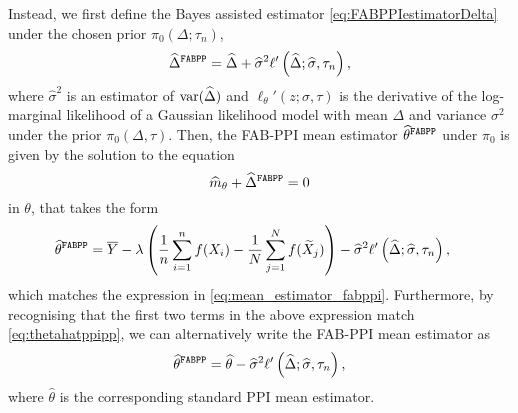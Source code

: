 Instead, we first define the Bayes assisted estimator \eqref{eq:FABPPIestimatorDelta} under the chosen prior $\pi_0(\Delta; \tau_n)$,
\begin{equation*}
    \widehat\Delta^{\mathrm{\texttt{FABPP}}} = \widehat\Delta + \widehat\sigma^2 \ell'\left(\widehat\Delta; \widehat\sigma, \tau_n\right),
\end{equation*}
where $\widehat\sigma^2$ is an estimator of $\mathrm{var}(\widehat\Delta)$ and $\ell_\theta'(z; \sigma, \tau)$ is the derivative of the log-marginal likelihood of a Gaussian likelihood model with mean $\Delta$ and variance $\sigma^2$ under the prior $\pi_0(\Delta, \tau)$. Then, the FAB-PPI mean estimator $\widehat\theta^{\mathrm{\texttt{FABPP}}}$ under $\pi_0$ is given by the solution to the equation
\begin{equation*}
    \widehat m_\theta + \widehat\Delta^{\mathrm{\texttt{FABPP}}} = 0
\end{equation*}
in $\theta$, that takes the form
\begin{align*}
    \widehat\theta^{\mathrm{\texttt{FABPP}}} &= \overline Y - \lambda \left(\frac{1}{n}\sum_{i=1}^n f(X_i) - \frac{1}{N}\sum_{j=1}^N f(\widetilde X_j)\right) - \widehat\sigma^2 \ell'\left(\widehat\Delta; \widehat\sigma, \tau_n\right),
\end{align*}
which matches the expression in \cref{eq:mean_estimator_fabppi}. Furthermore, by recognising that the first two terms in the above expression match \eqref{eq:thetahatppipp}, we can alternatively write the FAB-PPI mean estimator as
\begin{align*}
    \widehat\theta^{\mathrm{\texttt{FABPP}}} = \widehat{\theta} - \widehat\sigma^2 \ell'\left(\widehat\Delta; \widehat\sigma, \tau_n\right),
\end{align*}
where $\widehat\theta$ is the corresponding standard PPI mean estimator.

